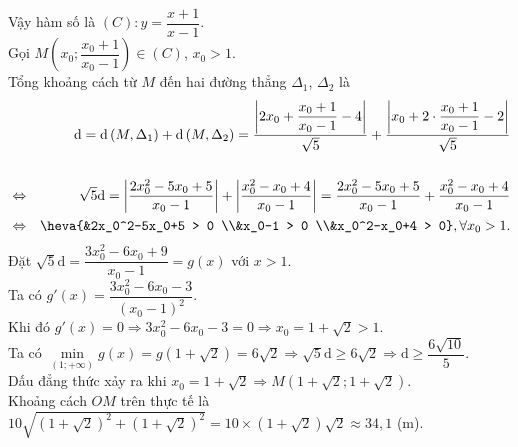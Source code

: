 \begin{ex}
{Vậy hàm số là $(C)\colon y=\dfrac{x+1}{x-1}$.\\
Gọi $M\left(x_0;\dfrac{x_0+1}{x_0-1}\right) \in (C)$, $x_0>1$.\\
Tổng khoảng cách từ $M$ đến hai đường thẳng $\Delta_1$, $\Delta_2$ là
\allowdisplaybreaks
\begin{eqnarray*}
	&&\mathrm{d}=\mathrm{d}\left(M,\Delta_1\right)+\mathrm{d}\left(M, \Delta_2\right)=\dfrac{\left|2x_0+\dfrac{x_0+1}{x_0-1}- 4\right|}{\sqrt{5}}+\dfrac{\left|x_0+2 \cdot \dfrac{x_0+1}{x_0-1}-2\right|}{\sqrt{5}}\\\\
	&\Leftrightarrow & \sqrt{5} \mathrm{d}=\left|\dfrac{2x_0^2-5x_0+5}{x_0-1}\right|+\left|\dfrac{x_0^2-x_0+4}{x_0-1}\right|=\dfrac{2x_0^2-5x_0+5}{x_0-1}+\dfrac{x_0^2-x_0+4}{x_0-1}\\
	&\Leftrightarrow & \heva{&2x_0^2-5x_0+5 > 0 \\&x_0-1 > 0 \\&x_0^2-x_0+4 > 0}, \forall x_0 > 1.
\end{eqnarray*}
Đặt $\sqrt{5}\mathrm{d}= \dfrac{3x_0^2-6x_0+9}{x_0-1}=g(x)$ với $x > 1$.\\
Ta có $g'(x)=\dfrac{3x_0^2-6x_0-3}{\left(x_0-1\right)^2}$.\\
Khi đó $g'(x)=0 \Rightarrow 3x_0^2-6x_0-3=0 \Rightarrow x_0=1+\sqrt{2}>1$.\\
Ta có $\min\limits _{(1; +\infty)} g(x)=g \left(1+\sqrt{2}\right)=6\sqrt{2} \Rightarrow \sqrt{5}\mathrm{d} \geq 6 \sqrt{2} \Rightarrow \mathrm{d} \geq \dfrac{6\sqrt{10}}{5}$.\\
Dấu đẳng thức xảy ra khi $x_0=1+\sqrt{2} \Rightarrow M \left(1+\sqrt{2}; 1+\sqrt{2}\right)$.\\
Khoảng cách $OM$ trên thực tế là $10\sqrt{\left(1+\sqrt{2}\right)^2+\left(1+\sqrt{2}\right)^2}=10 \times\left(1+\sqrt{2}\right) \sqrt{2} \approx 34{,}1$ (m).
}		
\end{ex}

